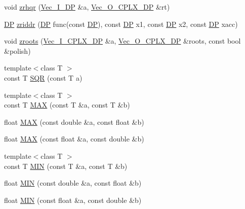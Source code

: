 \begin{DoxyCompactItemize}
\item 
void \mbox{\hyperlink{namespaceNR_a07f1329337e99d2666332950c702b2c7}{zrhqr}} (\mbox{\hyperlink{namespaceNR_a9f943da53862537c552e2a770cb170ae}{Vec\+\_\+\+I\+\_\+\+DP}} \&a, \mbox{\hyperlink{namespaceNR_ace78d6fd6a189eda11ef1f1ec73692d9}{Vec\+\_\+\+O\+\_\+\+C\+P\+L\+X\+\_\+\+DP}} \&rt)
\item 
\mbox{\hyperlink{namespaceNR_af6ff762dd605ff477b8e52387253a02a}{DP}} \mbox{\hyperlink{namespaceNR_a13232764cfbf0d7a5acabe727c7109bd}{zriddr}} (\mbox{\hyperlink{namespaceNR_af6ff762dd605ff477b8e52387253a02a}{DP}} func(const \mbox{\hyperlink{namespaceNR_af6ff762dd605ff477b8e52387253a02a}{DP}}), const \mbox{\hyperlink{namespaceNR_af6ff762dd605ff477b8e52387253a02a}{DP}} x1, const \mbox{\hyperlink{namespaceNR_af6ff762dd605ff477b8e52387253a02a}{DP}} x2, const \mbox{\hyperlink{namespaceNR_af6ff762dd605ff477b8e52387253a02a}{DP}} xacc)
\item 
void \mbox{\hyperlink{namespaceNR_a7c019f6e455600b25e89123914373a23}{zroots}} (\mbox{\hyperlink{namespaceNR_ad1b14bf0517c78cb2e0c1407b08ba92b}{Vec\+\_\+\+I\+\_\+\+C\+P\+L\+X\+\_\+\+DP}} \&a, \mbox{\hyperlink{namespaceNR_ace78d6fd6a189eda11ef1f1ec73692d9}{Vec\+\_\+\+O\+\_\+\+C\+P\+L\+X\+\_\+\+DP}} \&roots, const bool \&polish)
\item 
{\footnotesize template$<$class T $>$ }\\const T \mbox{\hyperlink{namespaceNR_a992bfd1c07cbd8f9fe94e42c055fd656}{S\+QR}} (const T a)
\item 
{\footnotesize template$<$class T $>$ }\\const T \mbox{\hyperlink{namespaceNR_a92c68d40de4a9647ae9f24ec57c53b0e}{M\+AX}} (const T \&a, const T \&b)
\item 
float \mbox{\hyperlink{namespaceNR_a1ccd7f766f5de91f30115cf7298019fa}{M\+AX}} (const double \&a, const float \&b)
\item 
float \mbox{\hyperlink{namespaceNR_a77558a6eb41778af357e2b2fbc811eeb}{M\+AX}} (const float \&a, const double \&b)
\item 
{\footnotesize template$<$class T $>$ }\\const T \mbox{\hyperlink{namespaceNR_a15f220f878bd3544d0d5b2036cf73835}{M\+IN}} (const T \&a, const T \&b)
\item 
float \mbox{\hyperlink{namespaceNR_a5226e93da6f48d0d3702fa55e6c27052}{M\+IN}} (const double \&a, const float \&b)
\item 
float \mbox{\hyperlink{namespaceNR_a73fa23c417e474fe668884249420b5d9}{M\+IN}} (const float \&a, const double \&b)

\end{DoxyCompactItemize}
